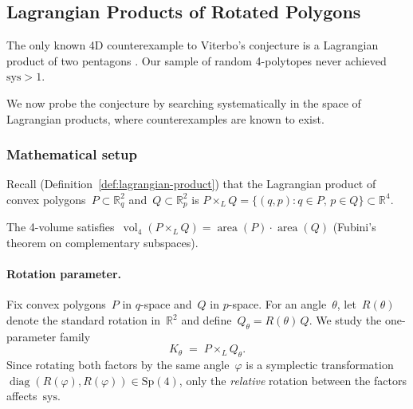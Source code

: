 %
%
%

\subsection{Lagrangian Products of Rotated Polygons}
\label{sec:lagrangian-products}

The only known 4D counterexample to Viterbo's conjecture is a Lagrangian
product of two pentagons \cite{HaimKislevOstrover2024}.
Our sample of random 4-polytopes never achieved~$\mathrm{sys} > 1$.

We now probe the conjecture by searching systematically in the space of Lagrangian products, where counterexamples are known to exist.

\subsubsection*{Mathematical setup}

Recall (Definition~\ref{def:lagrangian-product}) that the Lagrangian product
of convex polygons~$P \subset \mathbb{R}^2_q$ and~$Q \subset \mathbb{R}^2_p$
is $P \times_L Q = \{(q,p) : q \in P,\, p \in Q\} \subset \mathbb{R}^4$.

The 4-volume satisfies~$\operatorname{vol}_4(P \times_L Q)
= \operatorname{area}(P) \cdot \operatorname{area}(Q)$ (Fubini's theorem on
complementary subspaces).

\paragraph{Rotation parameter.}
Fix convex polygons~$P$ in $q$-space and~$Q$ in $p$-space.
For an angle~$\theta$, let~$R(\theta)$ denote
the standard rotation in~$\mathbb{R}^2$ and
define~$Q_\theta = R(\theta)\,Q$. We study the one-parameter family
\[
  K_\theta \;=\; P \times_L Q_\theta.
\]
Since rotating both factors by the same angle~$\varphi$ is a symplectic
transformation~$\operatorname{diag}(R(\varphi), R(\varphi)) \in \mathrm{Sp}(4)$,
only the \emph{relative} rotation between the factors affects~$\mathrm{sys}$.

